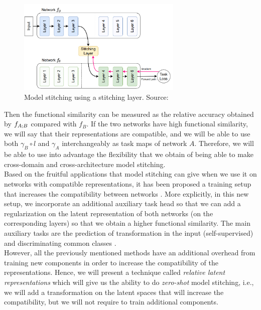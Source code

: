 \documentclass[../main.tex]{subfiles}
\begin{document}
\begin{figure}[!ht]
    \centering
    \includegraphics[width=0.7\textwidth]{figures/bg/stich_lay.png} 
    \caption{Model stitching using a stitching layer. Source: \cite{csiszarik_similarity_2021}}
    \label{fig:stich_lay}
\end{figure}

Then the functional similarity can be measured as the relative accuracy obtained by $f_{A \mathbin{;} B}$ compared with $f_B$. If the two networks have high functional similarity, we will say that their representations are compatible, and we will be able to use both $\gamma_B \circ l$ and $\gamma_A$ interchangeably as task maps of network $A$. Therefore, we will be able to use into advantage the flexibility that we obtain of being able to make cross-domain and cross-architecture model stitching.\\

Based on the fruitful applications that model stitching can give when we use it on networks with compatible representations, it has been proposed a training setup that increases the compatibility between networks \cite{gygli_towards_2020}. More explicitly, in this new setup, we incorporate an additional auxiliary task head so that we can add a regularization on the latent representation of both networks (on the corresponding layers) so that we obtain a higher functional similarity. The main auxiliary tasks are the prediction of transformation in the input (self-supervised) and discriminating common classes \cite{gygli_towards_2020}.\\

However, all the previously mentioned methods have an additional overhead from training new components in order to increase the compatibility of the representations. Hence, we will present a technique called \emph{relative latent representations} which will give us the ability to do \emph{zero-shot} model stitching, i.e., we will add a transformation on the latent spaces that will increase the compatibility, but we will not require to train additional components. 
\end{document}
